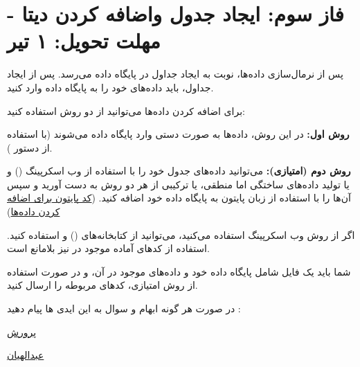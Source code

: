 \documentclass[12pt]{article}
\begin{document}
\fontsize{12pt}{14pt}\selectfont




\renewcommand{\abstractname}{طراحی پایگاه داده فروشگاه آنلاین}


\section{فاز سوم: ایجاد جدول واضافه کردن دیتا  - مهلت تحویل: ۱ تیر}


پس از نرمال‌سازی داده‌ها، نوبت به ایجاد جداول در پایگاه داده  می‌رسد. پس از ایجاد جداول، باید داده‌های خود را به پایگاه داده وارد کنید.

برای اضافه کردن داده‌ها می‌توانید از دو روش استفاده کنید:

\textbf{روش اول:} در این روش، داده‌ها به صورت دستی وارد پایگاه داده می‌شوند (با استفاده از دستور \texttt{}).

\textbf{روش دوم (امتیازی):} می‌توانید داده‌های جدول خود را با استفاده از وب اسکرپینگ () و یا تولید داده‌های ساختگی اما منطقی، یا ترکیبی از هر دو روش به دست آورید و سپس آن‌ها را با استفاده از زبان پایتون به پایگاه داده خود اضافه کنید. (\href{https://github.com/parvvaresh/Online-Shop-database-design/blob/main/Phase3/insert_data.py}{کد پایتون برای اضافه کردن داده‌ها})

اگر از روش وب اسکرپینگ استفاده می‌کنید، می‌توانید از کتابخانه‌های \texttt{} () و \texttt{} استفاده کنید. استفاده از کدهای آماده موجود در  نیز بلامانع است.

شما باید یک فایل  شامل پایگاه داده خود و داده‌های موجود در آن، و در صورت استفاده از روش امتیازی، کدهای مربوطه را ارسال کنید.

در صورت هر گونه ابهام و سوال به این ایدی ها پیام دهید :‌

\href{https://t.me/Ali_Abdollahian_Noghabi}{پرورش}

\href{https://t.me/parvvaresh}{‫ﻋﺒﺪﺍﻟﻬﻴﺎﻥ‬}
\end{document}
